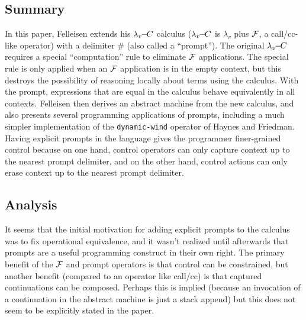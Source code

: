 \documentclass[letterpaper]{llncs}
\begin{document}

\subsection*{Summary}
In this paper, Felleisen extends his $ \lambda_v\!\!-\!\!C $ calculus ($ \lambda_v\!\!-\!\!C $ is $\lambda_v$ plus $ \mathcal{F} $, a call/cc-like operator) with a delimiter \# (also called a ``prompt''). The original $ \lambda_v\!\!-\!\!C $ requires a special ``computation'' rule to eliminate $ \mathcal{F} $ applications. The special rule is only applied when an $ \mathcal{F} $ application is in the empty context, but this destroys the possibility of reasoning locally about terms using the calculus. With the prompt, expressions that are equal in the calculus behave equivalently in all contexts. Felleisen then derives an abstract machine from the new calculus, and also presents several programming applications of prompts, including a much simpler implementation of the \texttt{dynamic-wind} operator of Haynes and Friedman. Having explicit prompts in the language gives the programmer finer-grained control because on one hand, control operators can only capture context up to the nearest prompt delimiter, and on the other hand, control actions can only erase context up to the nearest prompt delimiter.

\subsection*{Analysis}

It seems that the initial motivation for adding explicit prompts to the calculus was to fix operational equivalence, and it wasn't realized until afterwards that prompts are a useful programming construct in their own right. The primary benefit of the $ \mathcal{F} $ and prompt operators is that control can be constrained, but another benefit (compared to an operator like call/cc) is that captured continuations can be composed. Perhaps this is implied (because an invocation of a continuation in the abstract machine is just a stack append) but this does not seem to be explicitly stated in the paper. 
\end{document}
